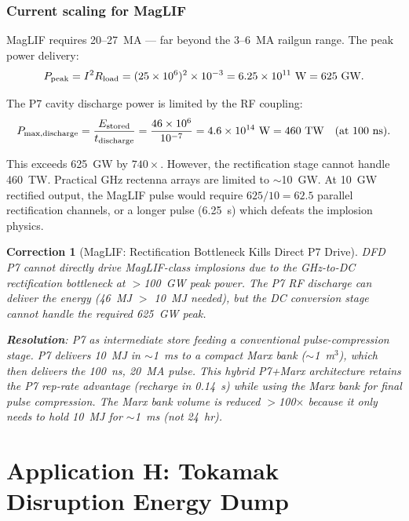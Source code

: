 \documentclass[11pt]{article}
\newtheorem{correction}{Correction}
\newcommand{\ee}[1]{\times 10^{#1}}
\begin{document}
\subsubsection{Current scaling for MagLIF}

MagLIF requires 20--27~MA --- far beyond the 3--6~MA railgun range.
The peak power delivery:
\begin{equation}
P_{\rm peak} = I^2 R_{\rm load} = (25\ee{6})^2 \times 10^{-3}
= 6.25\ee{11}~\text{W} = 625~\text{GW}.
\end{equation}

The P7 cavity discharge power is limited by the RF coupling:
\begin{equation}
P_{\rm max,discharge} = \frac{E_{\rm stored}}{t_{\rm discharge}}
= \frac{46\ee{6}}{10^{-7}} = 4.6\ee{14}~\text{W} = 460~\text{TW}
\quad\text{(at 100~ns)}.
\end{equation}

This exceeds 625~GW by $740\times$. However, the rectification stage
cannot handle 460~TW. Practical GHz rectenna arrays are limited to
$\sim$10~GW. At 10~GW rectified output, the MagLIF pulse would
require $625/10 = 62.5$ parallel rectification channels, or a
longer pulse (6.25~s) which defeats the implosion physics.

\begin{correction}[MagLIF: Rectification Bottleneck Kills Direct P7 Drive]
\label{corr:MagLIF}
DFD P7 cannot directly drive MagLIF-class implosions due to the
GHz-to-DC rectification bottleneck at $>$100~GW peak power. The
P7 RF discharge can deliver the energy (46~MJ $>$ 10~MJ needed),
but the DC conversion stage cannot handle the required 625~GW peak.

\textbf{Resolution}: P7 as intermediate store feeding a conventional
pulse-compression stage. P7 delivers 10~MJ in $\sim$1~ms to a
compact Marx bank ($\sim$1~m$^3$), which then delivers the 100~ns,
20~MA pulse. This hybrid P7+Marx architecture retains the P7 rep-rate
advantage (recharge in 0.14~s) while using the Marx bank for final
pulse compression. The Marx bank volume is reduced $>$100$\times$
because it only needs to hold 10~MJ for $\sim$1~ms (not 24~hr).
\end{correction}

\section{Application H: Tokamak Disruption Energy Dump}
\label{sec:disruption}
\end{document}
